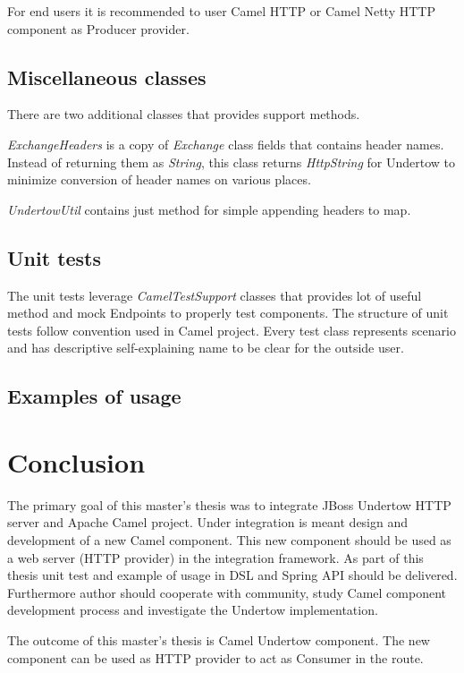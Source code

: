 \documentclass[12pt,final,oneside]{fithesis2}
\begin{document}
For end users it is recommended to user Camel HTTP or Camel Netty HTTP component as Producer provider.


\section{Miscellaneous classes}
There are two additional classes that provides support methods.

\textit{ExchangeHeaders} is a copy of \textit{Exchange} class fields that contains header names. Instead of returning them as \textit{String}, this class returns \textit{HttpString} for Undertow to minimize conversion of header names on various places.

\textit{UndertowUtil} contains just method for simple appending headers to map.

\section{Unit tests}
The unit tests leverage \textit{CamelTestSupport} classes that provides lot of useful method and mock Endpoints to properly test components. The structure of unit tests follow convention used in Camel project. Every test class represents scenario and has descriptive self-explaining name to be clear for the outside user.

\section{Examples of usage}



\chapter{Conclusion}
The primary goal of this master's thesis was to integrate JBoss Undertow HTTP server and Apache Camel project. Under integration is meant design and development of a new Camel component. This new component should be used as a web server (HTTP provider) in the integration framework. As part of this thesis unit test and example of usage in DSL and Spring API should be delivered. Furthermore author should cooperate with community, study Camel component development process and investigate the Undertow implementation.

The outcome of this master's thesis is Camel Undertow component. The new component can be used as HTTP provider to act as Consumer in the route. 
\end{document}
